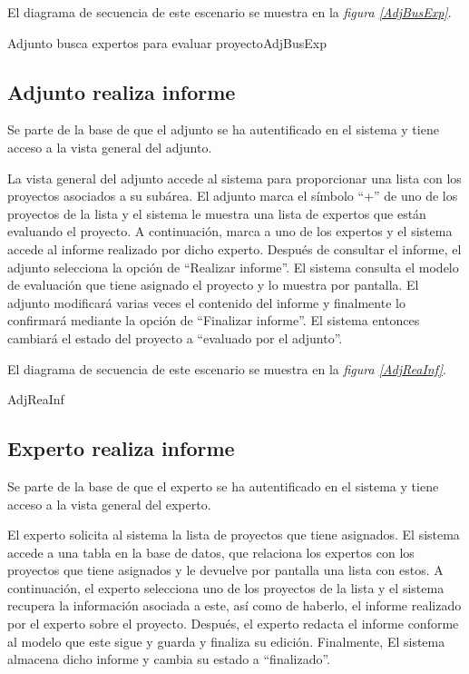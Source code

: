 \documentclass[11pt,a4paper,spanish,twoside]{book}
\begin{document}
El diagrama de secuencia de este escenario se muestra en la \emph{figura
\ref{AdjBusExp}}.

{Adjunto busca expertos para evaluar proyecto}{AdjBusExp}

\subsection{Adjunto realiza informe}
Se parte de la base de que el adjunto se ha autentificado en el sistema y
tiene acceso a la vista general del adjunto.

La vista general del adjunto accede al sistema para proporcionar una lista
con los proyectos asociados a su subárea. El adjunto marca el símbolo ``+''
de uno de los proyectos de la lista y el sistema le muestra una lista de 
expertos que están evaluando el proyecto. A continuación, marca a uno de los
expertos y el sistema accede al informe realizado por dicho experto. Después
de consultar el informe, el adjunto selecciona la opción de ``Realizar
informe''. El sistema consulta el modelo de evaluación que tiene asignado el
proyecto y lo muestra por pantalla. El adjunto modificará varias veces
el contenido del informe y finalmente lo confirmará mediante la opción de
``Finalizar informe''. El sistema entonces cambiará el estado del proyecto a
``evaluado por el adjunto''.

El diagrama de secuencia de este escenario se muestra en la \emph{figura
\ref{AdjReaInf}}.

{AdjReaInf}

\subsection{Experto realiza informe}
Se parte de la base de que el experto se ha autentificado en el sistema y
tiene acceso a la vista general del experto.

El experto solicita al sistema la lista de proyectos que tiene asignados. El
sistema accede a una tabla en la base de datos, que relaciona los expertos con
los proyectos que tiene asignados y le devuelve por pantalla una lista con 
estos. A continuación, el experto selecciona uno de los proyectos de la lista
y el sistema recupera la información asociada a este, así como de haberlo, el
informe realizado por el experto sobre el proyecto. Después, el experto
redacta el informe conforme al modelo que este sigue y guarda y finaliza su
edición. Finalmente, El sistema almacena dicho informe y cambia su estado a
``finalizado''.
\end{document}
